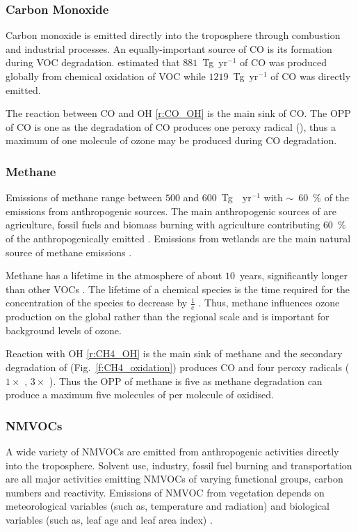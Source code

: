 \vspace{-2mm}
\subsubsection{Carbon Monoxide}
\vspace{-2mm}
Carbon monoxide is emitted directly into the troposphere through combustion and industrial processes.
An equally-important source of CO is its formation during VOC degradation.
\citet{Hauglustaine:1998} estimated that $881$~Tg~yr$^{-1}$ of CO was produced globally from chemical oxidation of VOC while $1219$~Tg~yr$^{-1}$ of CO was directly emitted.

The reaction between CO and OH \eqref{r:CO_OH} is the main sink of CO.
The OPP of CO is one as the degradation of CO produces one peroxy radical (), thus a maximum of one molecule of ozone may be produced during CO degradation.

\vspace{-2mm}
\subsubsection{Methane}
\vspace{-2mm}
Emissions of methane range between $500$ and $600$~Tg~~yr$^{-1}$ with $\sim$~$60$~\% of the emissions from anthropogenic sources.
The main anthropogenic sources of  are agriculture, fossil fuels and biomass burning with agriculture contributing $60$~\% of the anthropogenically emitted .
Emissions from wetlands are the main natural source of methane emissions \citep{Kirschke:2013}.

Methane has a lifetime in the atmosphere of about $10$~years, significantly longer than other VOCs \citep{Voulgarakis:2013}.
The lifetime of a chemical species is the time required for the concentration of the species to decrease by $\frac{1}{e}$ \citep{Seinfeld:2006}.
Thus, methane influences ozone production on the global rather than the regional scale and is important for background levels of ozone.  

Reaction with OH \eqref{r:CH4_OH} is the main sink of methane and the secondary degradation of  (Fig.~\ref{f:CH4_oxidation}) produces CO and four peroxy radicals ($1 \times$ , $3 \times$ ).
Thus the OPP of methane is five as methane degradation can produce a maximum five molecules of  per molecule of  oxidised. 

\subsubsection{NMVOCs}
A wide variety of NMVOCs are emitted from anthropogenic activities directly into the troposphere.
Solvent use, industry, fossil fuel burning and transportation are all major activities emitting NMVOCs of varying functional groups, carbon numbers and reactivity.
Emissions of NMVOC from vegetation depends on meteorological variables (such as, temperature and radiation) and biological variables (such as, leaf age and leaf area index) \citep{Guenther:2012}.

